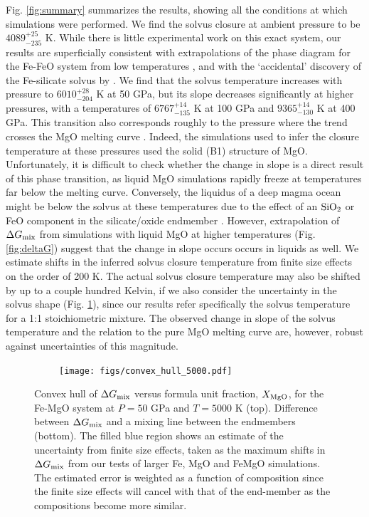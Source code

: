 Fig. \ref{fig:summary} summarizes the results, showing all the conditions at which
simulations were performed.  We find the solvus closure at ambient pressure to be
$4089^{+25}_{-235}$ K.  While there is little experimental work on this exact system, our
results are superficially consistent with extrapolations of the phase diagram for the
Fe-FeO system from low temperatures \citep{Ohtani1984a,McCammon1983}, and with the
`accidental' discovery of the Fe-silicate solvus by \cite{Walker1993}. We find that the
solvus temperature increases with pressure to $6010^{+28}_{-204}$ K at 50 GPa, but its
slope decreases significantly at higher pressures, with a temperatures of
$6767^{+14}_{-135}$ K at 100 GPa and $9365^{+14}_{-130}$ K at 400 GPa.  This transition
also corresponds roughly to the pressure where the trend crosses the MgO melting curve
\citep{Alfe2005, Belonoshko2010,Boates2013}.  Indeed, the simulations used to infer the
closure temperature at these pressures used the solid (B1) structure of MgO.
Unfortunately, it is difficult to check whether the change in slope is a direct result of
this phase transition, as liquid MgO simulations rapidly freeze at temperatures far below
the melting curve.  Conversely, the liquidus of a deep magma ocean might be below the
solvus at these temperatures due to the effect of an $\rm{SiO_2}$ or FeO component in the
silicate/oxide endmember \citep{deKoker2013,Zerr1998}. However, extrapolation of $\Delta
G_{\rm mix}$ from simulations with liquid MgO at higher temperatures (Fig.
\ref{fig:deltaG}) suggest that the change in slope occurs occurs in liquids as well. We
estimate shifts in the inferred solvus closure temperature from finite size effects on
the order of 200 K. The  actual solvus closure temperature may also be shifted by up to a
couple hundred Kelvin, if we also consider the uncertainty in the solvus shape (Fig.
\ref{fig:convex_hull}), since our results refer specifically the solvus temperature for a
1:1 stoichiometric mixture.  The observed change in slope of the solvus temperature and
the relation to the pure MgO melting curve are, however, robust against uncertainties of
this magnitude.

\begin{figure}[h!]  
  \centering
    \texttt{[image: figs/convex\_hull\_5000.pdf]}
\caption{Convex hull of $\Delta G_{\rm{mix}}$ versus formula unit fraction, $X_{\rm
MgO}$, for the Fe-MgO system at $P=50$ GPa and $T=5000$ K (top). Difference between
$\Delta G_{\rm{mix}}$ and a mixing line between the endmembers (bottom). The filled blue
region shows an estimate of the uncertainty from finite size effects, taken as the
maximum shifts in $\Delta G_{\rm{mix}}$ from our tests of larger Fe, MgO and FeMgO
simulations. The estimated error is weighted as a function of composition since the
finite size effects will cancel with that of the end-member as the compositions become
more similar.
}
\label{fig:convex_hull}
\end{figure}

